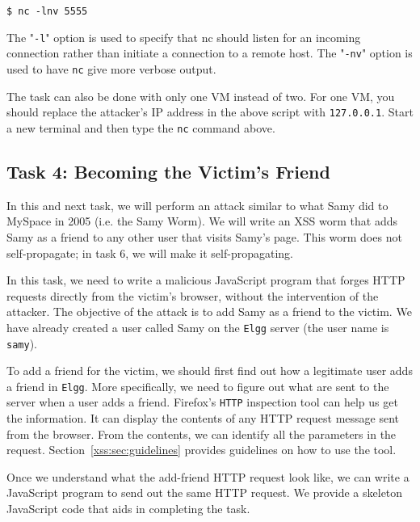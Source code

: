 \begin{lstlisting}
$ nc -lnv 5555 
\end{lstlisting}

\noindent The "{\tt -l}" option is used to specify that nc should listen for an incoming
connection rather than initiate a connection to a remote host. The "{\tt -nv}" option is used to
have \texttt{nc} give more verbose output.


The task can also be done with only one VM instead of two. For one VM, you should replace the
attacker's IP address in the above script with {\tt 127.0.0.1}. Start a new terminal and then
type the {\tt nc} command above.





\subsection{Task 4: Becoming the Victim's Friend}

In this and next task, we will perform an attack similar to what Samy did to MySpace in 2005
(i.e. the Samy Worm). We will write an XSS worm that adds Samy as a friend to any other user
that visits Samy's page. This worm does not self-propagate; in  task 6, we will make it
self-propagating.

In this task, we need to write a malicious JavaScript program that forges HTTP requests
directly from the victim's browser, without the intervention of the attacker.  The objective of
the attack is to add Samy as a friend to the victim. We have already created a user called Samy
on the {\tt Elgg} server (the user name is {\tt samy}).


To add a friend for the victim, we should first find out how a legitimate 
user adds a friend in {\tt Elgg}.
More specifically, we need to figure out what are sent to the server when a user 
adds a friend. Firefox's \texttt{HTTP} inspection tool 
can help us get the information. It can display the contents of any HTTP request message sent 
from the browser.  From the contents, we can identify all
the parameters in the request. Section~\ref{xss:sec:guidelines}
provides guidelines on how to use the tool.


Once we understand what the add-friend HTTP request look like, 
we can write a JavaScript program to send out the same HTTP request. We provide a skeleton
JavaScript code that aids in completing the task.

